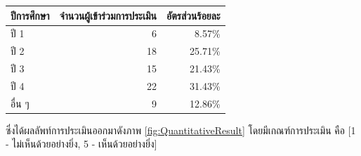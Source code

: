 \begin{enumerate}
\begin{table}[H]
            \label{tab:UserRatio}
            \begin{tabular}{|l|r|r|}
            \hline
            \textbf{ปีการศึกษา} & \multicolumn{1}{l|}{\textbf{จำนวนผู้เข้าร่วมการประเมิน}} & \multicolumn{1}{l|}{\textbf{อัตรส่วนร้อยละ}} \\ \hline
            ปี 1                & 6                                                          & 8.57\%                                         \\ \hline
            ปี 2                & 18                                                         & 25.71\%                                         \\ \hline
            ปี 3                & 15                                                         & 21.43\%                                         \\ \hline
            ปี 4                & 22                                                         & 31.43\%                                         \\ \hline
            อื่น ๆ              & 9                                                          & 12.86\%                                         \\ \hline
            \end{tabular}
        \end{table}
        \par{ซึ่งได้ผลลัพท์การประเมินออกมาดังภาพ \ref{fig:QuantitativeResult} โดยมีเกณฑ์การประเมิน คือ [1 - ไม่เห็นด้วยอย่างยิ่ง, 5 - เห็นด้วยอย่างยิ่ง]}
        \begin{figure}[H]\centering

\end{figure}
\end{enumerate}
